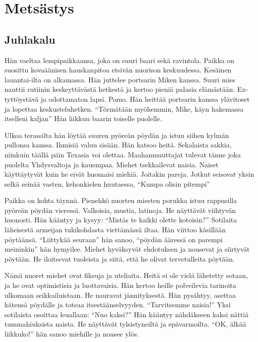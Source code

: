 \chapter{Metsästys}\label{the-hunt}

\section{Juhlakalu}

\begin{tarina}

Hän vaeltaa lempipaikkaansa, joka on suuri baari sekä ravintola. Paikka on suosittu kovaäänisen hauskanpitoa etsivän nuorison keskuudessa. Kesäinen lauantai-ilta on alkamassa. Hän juttelee portsarin Miken kanssa. Suuri mies nauttii rutiinin keskeyttävästä hetkestä ja kertoo pieniä palasia elämästään. Ex-tyttöystävä ja odottamaton lapsi. Pomo. Hän heittää portsarin kanssa ylävitoset ja lopettaa keskusteluhetken. ``Törmätään myöhemmin, Mike, käyn hakemassa itselleni kaljan'' Hän liikkuu baarin toiselle puolelle.

Ulkoa terassilta hän löytää suuren pyöreän pöydän ja istuu siihen kylmän pullonsa kanssa. Ihmisiä valuu sisään. Hän katsoo heitä. Sekalaista sakkia, niinkuin täällä päin Texasia voi olettaa. Maahanmuuttajat tulevat tänne joka puolelta Yhdysvaltoja ja kauempaa. Miehet tsekkailevat naisia. Naiset käyttäytyvät kuin he eivät huomaisi miehiä. Joitakin pareja. Jotkut seisovat yksin selkä seinää vasten, kehonkielen huutaessa, ``Kumpa olisin pitempi''

Paikka on kohta täynnä. Pienehkö nuorten miesten porukka istuu rappusilla pyöreän pöydän vieressä. Valkoisia, mustia, latinoja. He näyttävät viihtyvän huonosti. Hän kääntyy ja kysyy: ``Mistäs te kaikki olette kotoisin?'' Sotilaita läheisestä armeijan tukikohdasta viettämässä iltaa. Hän viittoo käsillään pöytäänsä. ``Liittykää seuraan\vmq{,}'' hän sanoo, ``pöydän ääressä on parempi meininkin\vmq{,}'' hän hymyilee. Miehet hyväksyvät ehdotuksen ja nousevat ja siirtyvät pöytään. He iloitsevat tuoleista ja siitä, että he olivat tervetulleita pöytään.

Nämä nuoret miehet ovat fiksuja ja uteliaita. Heitä ei ole vielä lähetetty sotaan, ja he ovat optimistisia ja luottavaisia. Hän kertoo heille polveilevia tarinoita ulkomaan seikkailuistaan. He nauravat jännityksestä. Hän pysähtyy, asettaa kätensä pöydälle ja toteaa itsestäänselvyyden. ``Tarvitsemme naisia!'' Yksi sotilaista osoittaa leuallaan: ``Nuo kaksi?'' Hän kääntyy nähdäkseen kaksi nättiä tummahiuksista naista. He näyttävät tylsistyneiltä ja epävarmoilta. ``OK, älkää liikkuko!'' hän sanoo miehille ja nousee ylös.


\end{tarina}
